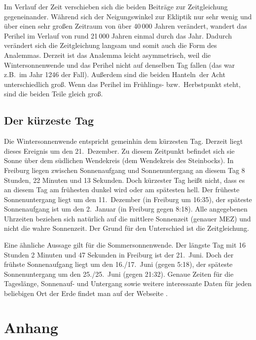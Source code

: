 Im Verlauf der Zeit verschieben sich die beiden Beitr\"age zur Zeitgleichung gegeneinander. 
W\"ahrend sich der Neigungswinkel zur Ekliptik nur sehr wenig und \"uber einen sehr gro\ss en
Zeitraum von \"uber 40\,000 Jahren ver\"andert, wandert das Perihel im Verlauf von rund 
21\,000 Jahren einmal durch das Jahr. Dadurch ver\"andert sich die Zeitgleichung langsam
und somit auch die Form des Analemmas. Derzeit ist das Analemma leicht asymmetrisch,
weil die Wintersonnenwende und das Perihel nicht auf denselben Tag fallen (das war z.B.\ im
Jahr 1246 der Fall). Au\ss erdem sind die beiden \glqq Hanteln\grqq\ der Acht unterschiedlich 
gro\ss. Wenn das Perihel im Fr\"uhlings- bzw.\ Herbstpunkt steht, sind die beiden Teile
gleich gro\ss.  

\subsection{Der k\"urzeste Tag}

Die Wintersonnenwende entspricht gemeinhin dem k\"urzesten Tag. Derzeit liegt dieses Ereignis
um den 21.\ Dezember. 
Zu diesem Zeitpunkt befindet sich sie Sonne \"uber dem s\"udlichen
Wendekreis (dem Wendekreis des Steinbocks). 
In Freiburg liegen zwischen Sonnenaufgang
und Sonnenuntergang an diesem Tag 8 Stunden, 22 Minuten und 13 Sekunden. Doch k\"urzester 
Tag hei\ss t nicht, dass es an diesem Tag am fr\"uhesten dunkel wird oder am sp\"atesten
hell. Der fr\"uheste Sonnenuntergang liegt um den 11.\ Dezember (in Freiburg um 16:35),
der sp\"ateste Sonnenaufgang ist um den 2.\ Januar (in Freiburg gegen 8:18). Alle angegebenen
Uhrzeiten beziehen sich nat\"urlich auf die mittlere Sonnenzeit (genauer MEZ) und nicht die
wahre Sonnenzeit. Der Grund f\"ur den Unterschied ist die Zeitgleichung. 

Eine \"ahnliche Aussage gilt f\"ur die Sommersonnenwende. 
Der l\"angste Tag mit
16 Stunden 2 Minuten und 47 Sekunden in Freiburg ist der 21.\ Juni. Doch der fr\"uhste Sonnenaufgang
liegt um den 16./17.\ Juni (gegen 5:18), der sp\"ateste Sonnenuntergang um den 25./25.\ Juni (gegen
21:32). Genaue Zeiten f\"ur die Tagesl\"ange, Sonnenauf- und Untergang sowie weitere
interessante Daten f\"ur jeden beliebigen Ort der Erde findet man auf der Webseite \cite{timeanddate}.

\section{Anhang}
